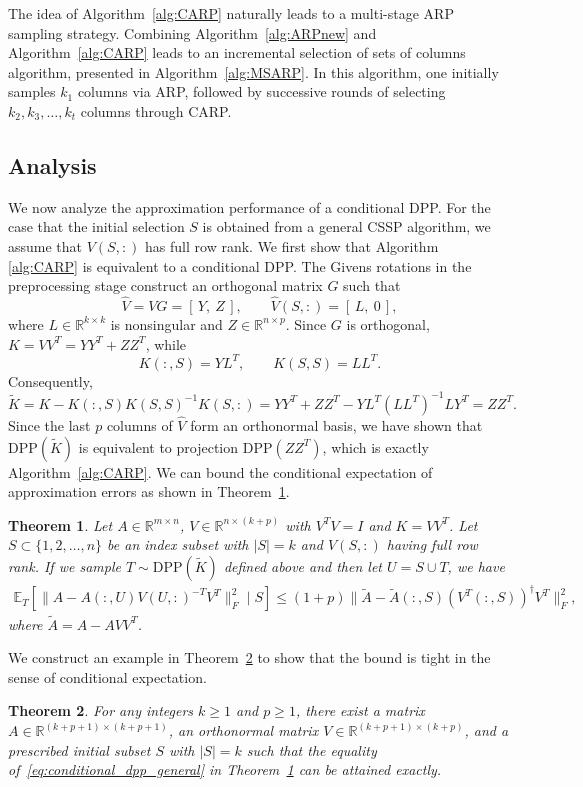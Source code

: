 \documentclass[11pt]{article}
\newtheorem{theorem}{Theorem}[section]
\newcommand{\be}{\begin{eqnarray}}
\newcommand{\ee}{\end{eqnarray}}
\newcommand{\R}{\mathbb{R}}
\newcommand{\Rmn}{\mathbb{R}^{m\times n}}
\newcommand{\<}{\langle}
\renewcommand{\>}{\rangle}
\begin{document}
The idea of Algorithm~\ref{alg:CARP} naturally leads to a multi-stage ARP sampling strategy. Combining Algorithm~\ref{alg:ARPnew} and Algorithm~\ref{alg:CARP} leads to an incremental selection of sets of columns algorithm, presented in Algorithm~\ref{alg:MSARP}. In this algorithm, one initially samples $k_1$ columns via ARP, followed by successive rounds of selecting $k_2, k_3, \dots, k_t$ columns through CARP.

\subsection{Analysis}
We now analyze the approximation performance of a conditional DPP. For the case that the initial selection $S$ is obtained from a general CSSP algorithm, we assume that $V(S,:)$ has full row rank. We first show that Algorithm \ref{alg:CARP} is equivalent to a conditional DPP. The Givens rotations in the preprocessing
stage construct an orthogonal matrix $G$ such that
\[
\widehat V = VG = [\,Y,\ Z\,],
\qquad
\widehat V(S,:)=[\,L,\ 0\,],
\]
where $L\in\mathbb{R}^{k\times k}$ is nonsingular and
$Z\in\mathbb{R}^{n\times p}$. Since $G$ is orthogonal,
$K=VV^T=YY^T+ZZ^T$, while
\[
K(:,S)=YL^T,\qquad K(S,S)=LL^T.
\]
Consequently,
\[
\widetilde K = K-K(:,S)K(S,S)^{-1}K(S,:)
 = YY^T+ZZ^T-YL^T(LL^T)^{-1}LY^T
 = ZZ^T.
\]
Since the last $p$ columns of $\widehat V$ form an orthonormal basis, we have shown that $\mathrm{DPP}(\widetilde K)$ is equivalent to projection $\mathrm{DPP}(ZZ^T)$, which is exactly Algorithm~\ref{alg:CARP}. We can bound the conditional expectation  of approximation errors as shown in Theorem~\ref{thm:conditional_dpp_general}.

\begin{theorem}
\label{thm:conditional_dpp_general}
    Let $A\in \Rmn$, $V \in \R^{n\times (k+p)} $ with $V^TV = I$ and $K = VV^T$. Let $S\subset \{1,2,\dots,n\}$ be an index subset with $|S| = k$ and $V(S,:)$ having  full row rank. If we sample $T\sim \mathrm{DPP}(\widetilde K)$ defined above and then let $U = S\cup T$, we have
    \be
    \label{eq:conditional_dpp_general}
    \mathbb{E}_T [ \|A - A(:,U)V(U,:)^{-T}V^T\|_F^2\mid S ] \leq (1 + p) \|\widetilde{A} -  \widetilde{A}(:,S)(V^T(:,S))^{\dagger} V^T\|_F^2,
    \ee
    where $\widetilde A = A - AVV^T$.
\end{theorem}
We construct an example in Theorem~\ref{thm:conditional-sharpness} to show that the bound is tight in the sense of conditional expectation.

\begin{theorem}
\label{thm:conditional-sharpness}
For any integers $k\geq 1$ and $p\geq 1$, there exist a matrix
$A\in\mathbb{R}^{(k+p+1)\times(k+p+1)}$, an orthonormal matrix
$V\in\mathbb{R}^{(k+p+1)\times(k+p)}$, and a prescribed initial
subset $S$ with $|S|=k$ such that the equality of~\eqref{eq:conditional_dpp_general} in
Theorem~\ref{thm:conditional_dpp_general} can be attained exactly.
\end{theorem}
\end{document}
